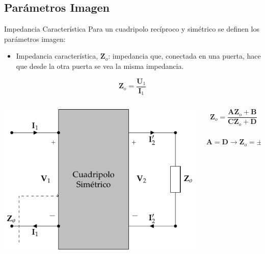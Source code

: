 \documentclass[aspectratio=169, usenames,svgnames,dvipsnames]{beamer}
\begin{document}
\subsection{Parámetros Imagen}
\label{sec:org4d42b9c}

\begin{frame}[label={sec:orgd72efeb}]{Impedancia Característica}
Para un cuadripolo \alert{recíproco} y \alert{simétrico} se definen los parámetros imagen:

\begin{itemize}
\item \alert{Impedancia característica}, \(\mathbf{Z}_o\): impedancia que, conectada en una puerta, hace que desde la otra puerta se vea la misma impedancia.
\end{itemize}
\[
  \mathbf{Z}_o = \frac{\mathbf{U}_1}{\mathbf{I}_1}
\]

\begin{columns}
\begin{column}{0.5\columnwidth}
\begin{center}
\includegraphics[height=0.5\textheight]{../figs/cuadripolo_impedancia_caracteristica.pdf}
\end{center}
\end{column}

\begin{column}{0.5\columnwidth}
\[
\mathbf{Z}_o = \frac{\mathbf{A} \mathbf{Z}_o + \mathbf{B}}{\mathbf{C}\mathbf{Z}_o + \mathbf{D}}
\]

\[
\mathbf{A} = \mathbf{D} \rightarrow \boxed{\mathbf{Z}_o = \pm \sqrt{\frac{\mathbf{B}}{\mathbf{C}}}}
\]
\end{column}
\end{columns}
\end{frame}
\end{document}
